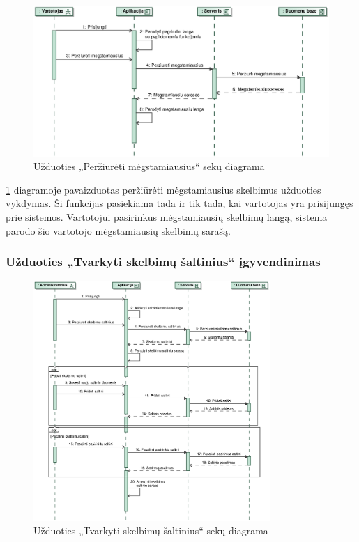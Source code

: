 \documentclass[12pt]{article}
\begin{document}
	\begin{figure}[h]
		\begin{center}
			\includegraphics[width=\textwidth]{PerziuretiMegstamiausius.eps}
			\caption{Užduoties „Peržiūrėti mėgstamiausius“ sekų diagrama\label{ViewFavSeq}}
		\end{center}
	\end{figure}
	
	\ref{ViewFavSeq} diagramoje pavaizduotas peržiūrėti mėgstamiausius skelbimus užduoties vykdymas. Ši funkcijas pasiekiama tada ir tik tada, kai vartotojas yra prisijungęs prie sistemos. Vartotojui pasirinkus mėgstamiausių skelbimų langą, sistema parodo šio vartotojo mėgstamiausių skelbimų sarašą.
	\pagebreak
	
	\subsubsection{Užduoties „Tvarkyti skelbimų šaltinius“ įgyvendinimas}
	
	\begin{figure}[h]
		\begin{center}
			\includegraphics[width=0.8\textwidth]{TvarkytiSkelbimuSaltinius.eps}
			\caption{Užduoties „Tvarkyti skelbimų šaltinius“ sekų diagrama\label{ManSouSeq}}
		\end{center}
	\end{figure}
	
\end{document}
